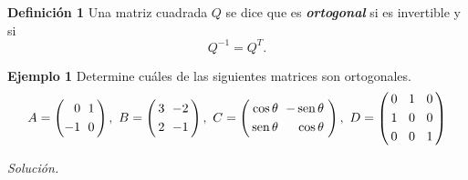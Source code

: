 \begin{frame}%
	
	\begin{block}{\textbf{Definición 1  }}
		\justifying
		Una matriz cuadrada $Q$ se dice que es  \textbf{\textit{ortogonal}} si es invertible y si 
		\[
		Q^{-1} = Q^T.
		\]
	\end{block}
	
	\begin{ej}{\textbf{Ejemplo 1}}
		\justifying
		Determine cuáles de las siguientes matrices son ortogonales.
		\[
			A = 
			\left(
			\begin{array}{@{\hspace{0\tabcolsep}}r@{\hspace{\tabcolsep}}r@{\hspace{0.3\tabcolsep}}}
			0 & 1  \\[1mm]
			-1 & 0 
			\end{array}
			\right),\
			B = 
			\left(
			\begin{array}{@{\hspace{0.3\tabcolsep}}r@{\hspace{\tabcolsep}}r@{\hspace{0.3\tabcolsep}}}
			3 & -2  \\[1mm]
			2 & -1 
			\end{array}
			\right),\
			C = 
			\left(
			\begin{array}{@{\hspace{0.3\tabcolsep}}r@{\hspace{\tabcolsep}}r@{\hspace{0.5\tabcolsep}}}
			\cos\theta & -\sen\theta  \\[1mm]
			\sen\theta & \cos\theta 
			\end{array}
			\right),\
			D = %
			\left(
			\begin{array}{@{\hspace{0.3\tabcolsep}}r@{\hspace{1.5\tabcolsep}}r@{\hspace{1.5\tabcolsep}}r@{\hspace{0.3\tabcolsep}}}
			0 & 1 & 0 \\[1mm]
			1 & 0 & 0\\[1mm]
			0 & 0 & 1
			\end{array}
			\right)
		\]

	\end{ej}
	\textit{Solución.}
	
\end{frame}


